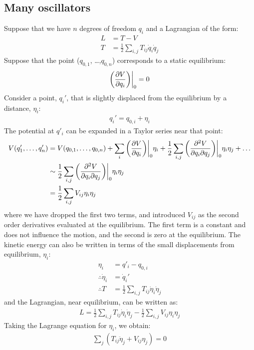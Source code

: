 \subsection{Many oscillators}
Suppose that we have $n$ degrees of freedom $q_i$ and a Lagrangian of the form:
\begin{align}
L&=T-V\nonumber\\
T&=\frac{1}{2}\sum_{i,j} T_{ij}\dot{q}_i\dot q_j
\end{align}
Suppose that the point ($q_{0,1}$, \dots ,$q_{0,n}$) corresponds to a static equilibrium:
\begin{align}
\left(\frac{\partial V}{\partial q_i}\right)\biggr\rvert_0=0
\end{align}
Consider a point, $q_i'$, that is slightly displaced from the equilibrium by a distance, $\eta_i$:
\begin{align}
q_i'=q_{0,i}+\eta_i
\end{align}
The potential at $q'_i$ can be expanded in a Taylor series near that point:
\begin{align}
V(q_1',\dots ,q_n')&=V(q_{0,1}, \dots , q_{0,n})+\sum_i\left(\frac{\partial V}{\partial q_i}\right)\biggr\rvert_0\eta_i+\frac{1}{2}\sum_{i,j}\left(\frac{\partial^2 V}{\partial q_i\partial q_j}\right)\biggr\rvert_0\eta_i\eta_j+\dots\nonumber\\
&\sim\frac{1}{2}\sum_{i,j}\left(\frac{\partial^2 V}{\partial q_i\partial q_j}\right)\biggr\rvert_0\eta_i\eta_j\nonumber\\
&=\frac{1}{2}\sum_{i,j} V_{ij}\eta_i\eta_j
\end{align}
where we have dropped the first two terms, and introduced $V_{ij}$ as the second order derivatives evaluated at the equilibrium. The first term is a constant and does not influence the motion, and the second is zero at the equilibrium. The kinetic energy can also be written in terms of the small displacements from equilibrium, $\eta_i$:
\begin{align}
\eta_i&=q'_i-q_{0,i}\nonumber\\
\therefore \dot\eta_i&=\dot q_i'\nonumber\\
\therefore T&=\frac{1}{2}\sum_{i,j} T_{ij}\dot\eta_i\dot\eta_j
\end{align}
and the Lagrangian, near equilibrium, can be written as:
\begin{align}
L=\frac{1}{2}\sum_{i,j} T_{ij}\dot\eta_i\dot\eta_j-\frac{1}{2}\sum_{i,j}V_{ij}\eta_i\eta_j
\end{align}
Taking the Lagrange equation for $\eta_i$, we obtain:
\begin{align}
\sum_{j}\left(T_{ij}\ddot\eta_j+V_{ij}\eta_j\right)=0
\end{align}
